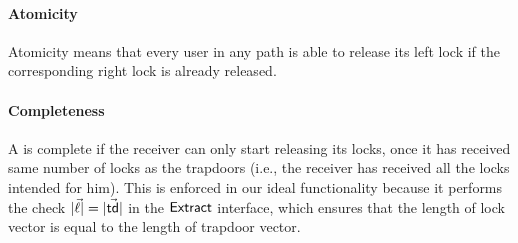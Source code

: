 
\paragraph{Atomicity} Atomicity means that every user in any path is able to release its left 
lock if the corresponding right lock is already released. 

\paragraph{Completeness} A \sysname is complete if the receiver can only start releasing its 
locks, once it has received same number of locks as the trapdoors (i.e., the receiver has 
received all the locks intended for him). This is enforced in our ideal functionality because 
it performs the check $|\vec{\ell}| = |\vec{\mathsf{td}}|$ in the $\mathsf{Extract}$ interface, which ensures 
that the length of lock vector is equal to the length of trapdoor vector.


